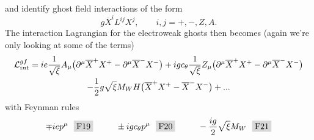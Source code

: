 and identify ghost field interactions of the form
\begin{equation}
  g\overline{X}^i L^{ij} X^j, \qquad i,j=+,-,Z,A.
\end{equation}
The interaction Lagrangian for the electroweak ghosts then becomes (again
we're only looking at some of the terms)
\begin{gather}
  \mathcal{L}_{int}^{gf}=ie\frac{1}{\sqrt{\xi}}A_\mu
                       \big(\partial^\mu \overline{X}^+X^+
                            -\partial^\mu \overline{X}^-X^-\big)
                   +igc_{\theta}\frac{1}{\sqrt{\xi}}Z_\mu
                       \big(\partial^\mu \overline{X}^+X^+
                            -\partial^\mu \overline{X}^-X^-\big)\\
                   -\frac{1}{2}g\sqrt{\xi}M_W H
                   \big(\overline{X}^+X^+ -\overline{X}^-X^-\big)+...\nonumber
\end{gather}
with Feynman rules
\begin{gather*}
 \mp iep^\mu~~\F{19}~~~~~~~~
 \pm ig\ct p^\mu~~\F{20}~~~~~~~~
 -\frac{ig}{2}\sqrt{\xi}M_W~~\F{21}
\end{gather*}
